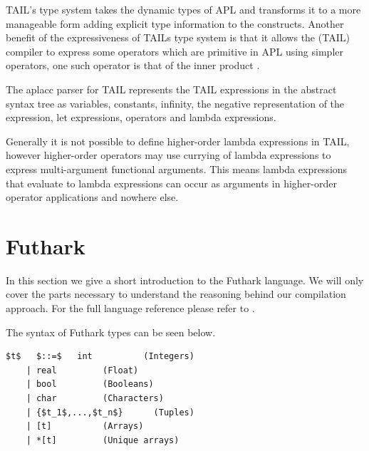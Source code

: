 \documentclass[11pt]{article}
\begin{document}
TAIL's type system takes the dynamic types of APL and transforms it to a more manageable form adding explicit type
information to the constructs.
Another benefit of the expressiveness of TAILs type system is that it allows the (TAIL) compiler to express some operators which
are primitive in APL using simpler operators, one such operator is that of the inner product \cite{ElsmanDybdal:Array:2014}. 

The aplacc parser for TAIL represents the TAIL expressions in the abstract syntax tree as variables, constants, infinity, the negative representation of 
the expression, let expressions, operators and lambda expressions. 


Generally it is not possible to define higher-order lambda expressions in TAIL, however higher-order operators
may use currying of lambda expressions to express multi-argument functional arguments.
This means lambda expressions that evaluate to lambda expressions can occur as arguments in higher-order operator
applications and nowhere else.



\section{Futhark}
\label{sec:futhark}

In this section we give a short introduction to the Futhark language. We will only cover the parts necessary to understand
the reasoning behind our compilation approach. For the full language reference please refer to \cite{TroelsHenriksen}.

The syntax of Futhark types can be seen below.
\begin{lstlisting}[numbers=none,frame=none]
$t$   $::=$   int          (Integers)
    | real         (Float)
    | bool         (Booleans)
    | char         (Characters)
    | {$t_1$,...,$t_n$}      (Tuples)
    | [t]          (Arrays)
    | *[t]         (Unique arrays)
\end{lstlisting}
\end{document}
